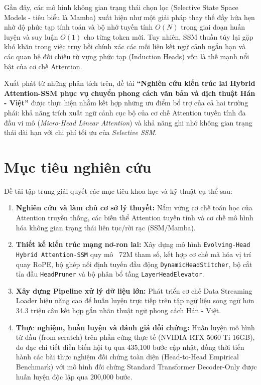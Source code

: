 \documentclass{uetgraduation}
\begin{document}
Gần đây, các mô hình không gian trạng thái chọn lọc (Selective State Space Models - tiêu biểu là Mamba) xuất hiện như một giải pháp thay thế đầy hứa hẹn nhờ độ phức tạp tính toán và bộ nhớ tuyến tính $O(N)$ trong giai đoạn huấn luyện và suy luận $O(1)$ cho từng token mới. Tuy nhiên, SSM thuần túy lại gặp khó khăn trong việc truy hồi chính xác các mối liên kết ngữ cảnh ngắn hạn và các quan hệ đối chiếu từ vựng phức tạp (Induction Heads) vốn là thế mạnh nổi bật của cơ chế Attention.

Xuất phát từ những phân tích trên, đề tài \textbf{``Nghiên cứu kiến trúc lai Hybrid Attention-SSM phục vụ chuyển phong cách văn bản và dịch thuật Hán - Việt''} được thực hiện nhằm kết hợp những ưu điểm bổ trợ của cả hai trường phái: khả năng trích xuất ngữ cảnh cục bộ của cơ chế Attention tuyến tính đa đầu vi mô (\textit{Micro-Head Linear Attention}) và khả năng ghi nhớ không gian trạng thái dài hạn với chi phí tối ưu của \textit{Selective SSM}.

\section{Mục tiêu nghiên cứu}
Đề tài tập trung giải quyết các mục tiêu khoa học và kỹ thuật cụ thể sau:
\begin{enumerate}
    \item \textbf{Nghiên cứu và làm chủ cơ sở lý thuyết:} Nắm vững cơ chế toán học của Attention truyền thống, các biến thể Attention tuyến tính và cơ chế mô hình hóa không gian trạng thái liên tục/rời rạc (SSM/Mamba).
    \item \textbf{Thiết kế kiến trúc mạng nơ-ron lai:} Xây dựng mô hình \texttt{Evolving-Head Hybrid Attention-SSM} quy mô ~72M tham số, kết hợp cơ chế mã hóa vị trí quay RoPE, bộ ghép nối định tuyến đầu động \texttt{DynamicHeadStitcher}, bộ cắt tỉa đầu \texttt{HeadPruner} và bộ phân bổ tầng \texttt{LayerHeadElevator}.
    \item \textbf{Xây dựng Pipeline xử lý dữ liệu lớn:} Phát triển cơ chế Data Streaming Loader hiệu năng cao để huấn luyện trực tiếp trên tập ngữ liệu song ngữ hơn 34.3 triệu câu kết hợp gắn nhãn thuật ngữ phong cách Hán - Việt.
    \item \textbf{Thực nghiệm, huấn luyện và đánh giá đối chứng:} Huấn luyện mô hình từ đầu (from scratch) trên phần cứng thực tế (NVIDIA RTX 5060 Ti 16GB), đo đạc chi tiết diễn biến hội tụ qua 435,100 bước cập nhật, đồng thời tiến hành các bài thực nghiệm đối chứng toàn diện (Head-to-Head Empirical Benchmark) với mô hình đối chứng Standard Transformer Decoder-Only được huấn luyện độc lập qua 200,000 bước.
\end{enumerate}
\end{document}
